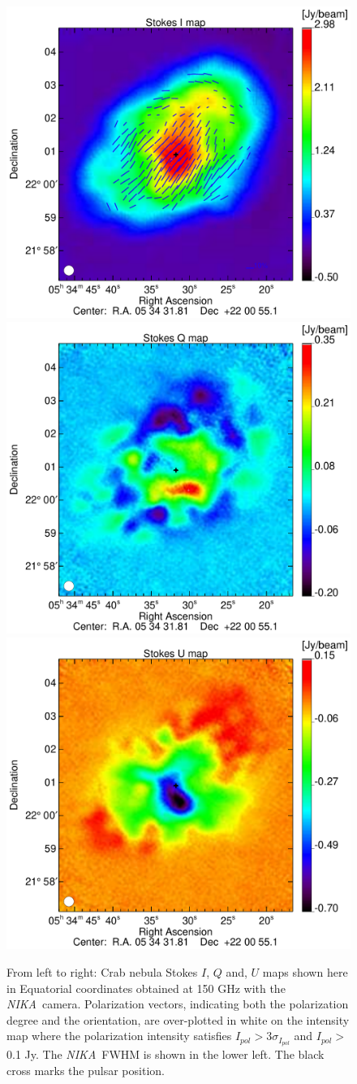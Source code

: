 \documentclass[twocolumn,traditabstract]{aa}
\def\NIKA{\textit{NIKA}}
\begin{document}
    
\maketitle
\begin{figure}[h!]
  \centering
     	  { \includegraphics[width=0.32\linewidth,keepaspectratio]{figures/Crab_i_v3.pdf}}	
	     { \includegraphics[width=0.32\linewidth,keepaspectratio]{figures/Crab_Q_v3_2mm.pdf}}
          { \includegraphics[width=0.32\linewidth,keepaspectratio]{figures/Crab_U_v3_2mm.pdf}} 
           \caption{From left to right: Crab nebula Stokes $I$, $Q$ and, $U$
             maps shown here in Equatorial coordinates obtained at 150 GHz with the \NIKA\ camera. Polarization
             vectors, indicating both the polarization degree and the orientation, are
             over-plotted in white on the intensity map where the polarization
             intensity satisfies $I_{pol} > 3 \sigma_{I_{pol}}$ and $I_{pol} >$ 0.1 Jy. The \NIKA\ FWHM is shown in the lower left.
             The black cross marks the pulsar position.}
\label{crab_intensity_maps}
\end{figure}
\end{document}
